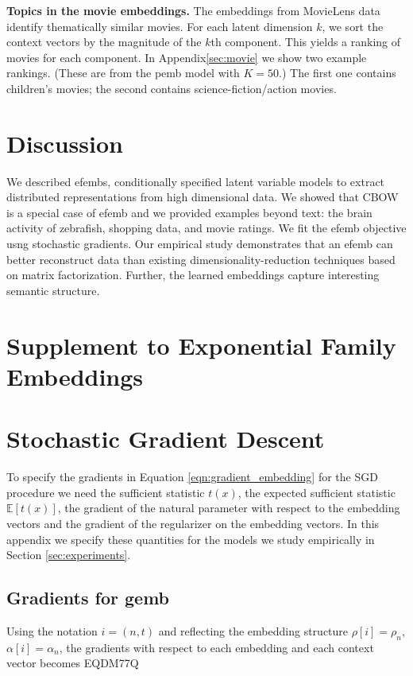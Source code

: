 \documentclass[12pt]{article}
\DeclareRobustCommand{\parhead}[1]{\vspace{0.05in} \textbf{#1} }
\begin{document}
\parhead{Topics in the movie embeddings.} The embeddings from
MovieLens data identify thematically similar movies. For each latent
dimension $k$, we sort the context vectors by the magnitude of the
$k$th component. This yields a ranking of movies for each component.
In Appendix\nobreakspace \ref {sec:movie} we show two example rankings. (These are from the
\gls{pemb} model with $K=50$.) The first one contains children's
movies; the second contains science-fiction/action movies.

\section{Discussion}
\glsresetall

We described \glspl{efemb}, conditionally specified latent variable
models to extract distributed representations from high dimensional
data.  We showed that \gls{CBOW} \citep{mikolov2013distributed} is a
special case of \gls{efemb} and we provided examples beyond text: the
brain activity of zebrafish, shopping data, and movie ratings.  We fit
the \gls{efemb} objective usng stochastic gradients.  Our empirical
study demonstrates that an \gls{efemb} can better reconstruct data
than existing dimensionality-reduction techniques based on matrix
factorization.  Further, the learned embeddings capture interesting
semantic structure.


\small

\clearpage
\normalsize
\appendix
\glsresetall
\section*{\centering Supplement to Exponential Family Embeddings}

\section{Stochastic Gradient Descent}
\label{sec:sgd}
To specify the gradients in Equation \ref{eqn:gradient_embedding} for the \gls{SGD} procedure  we need the sufficient statistic $t(x)$, the expected sufficient statistic $\mathbb{E}[t(x)]$, the gradient of the natural parameter with respect to the embedding vectors and the gradient of the regularizer on the embedding vectors. In this appendix we specify these quantities for the models we study empirically in Section \ref{sec:experiments}.
\subsection{Gradients for \gls{gemb}}
Using the notation $i = (n,t)$ and reflecting the embedding structure $\rho[i]=\rho_n$, $\alpha[i]=\alpha_n$, the gradients with respect to each embedding and each context vector becomes
 \label{sec:gaussian_gradients}
EQDM77Q
\end{document}
